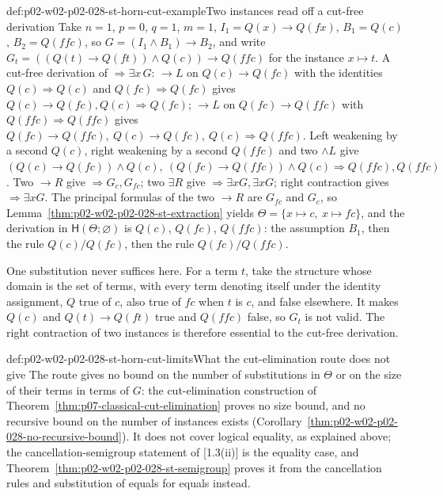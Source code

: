 \begin{hbexample}{def:p02-w02-p02-028-st-horn-cut-example}{Two instances read off a cut-free derivation}
Take \(n=1\), \(p=0\), \(q=1\), \(m=1\), \(I_1=Q(x)\to Q(fx)\),
\(B_1=Q(c)\), \(B_2=Q(ffc)\), so \(G=(I_1\land B_1)\to B_2\), and write
\(G_t=((Q(t)\to Q(ft))\land Q(c))\to Q(ffc)\) for the instance
\(x\mapsto t\).  A cut-free derivation of \(\Rightarrow\exists x\,G\):
\(\to L\) on \(Q(c)\to Q(fc)\) with the identities \(Q(c)\Rightarrow Q(c)\)
and \(Q(fc)\Rightarrow Q(fc)\) gives
\(Q(c)\to Q(fc),Q(c)\Rightarrow Q(fc)\); \(\to L\) on
\(Q(fc)\to Q(ffc)\) with \(Q(ffc)\Rightarrow Q(ffc)\) gives
\(Q(fc)\to Q(ffc),\ Q(c)\to Q(fc),\ Q(c)\Rightarrow Q(ffc)\).  Left
weakening by a second \(Q(c)\), right weakening by a second \(Q(ffc)\) and
two \(\land L\) give
\((Q(c)\to Q(fc))\land Q(c),\ (Q(fc)\to Q(ffc))\land Q(c)\Rightarrow
Q(ffc),Q(ffc)\).  Two \(\to R\) give \(\Rightarrow G_c,G_{fc}\); two
\(\exists R\) give \(\Rightarrow\exists xG,\exists xG\); right contraction
gives \(\Rightarrow\exists xG\).  The principal formulas of the two
\(\to R\) are \(G_{fc}\) and \(G_c\), so
Lemma~\ref{thm:p02-w02-p02-028-st-extraction} yields
\(\Theta=\{x\mapsto c,\ x\mapsto fc\}\), and the derivation in
\(\mathsf H(\Theta;\varnothing)\) is \(Q(c)\), \(Q(fc)\), \(Q(ffc)\): the
assumption \(B_1\), then the rule \(Q(c)/Q(fc)\), then the rule
\(Q(fc)/Q(ffc)\).

One substitution never suffices here.  For a term \(t\), take the structure
whose domain is the set of terms, with every term denoting itself under the
identity assignment, \(Q\) true of \(c\), also true of \(fc\) when \(t\) is
\(c\), and false elsewhere.  It makes \(Q(c)\) and \(Q(t)\to Q(ft)\) true
and \(Q(ffc)\) false, so \(G_t\) is not valid.  The right contraction of two
instances is therefore essential to the cut-free derivation.
\end{hbexample}

\begin{hbwarning}{def:p02-w02-p02-028-st-horn-cut-limits}{What the cut-elimination route does not give}
The route gives no bound on the number of substitutions in \(\Theta\) or on
the size of their terms in terms of \(G\): the cut-elimination construction
of Theorem~\ref{thm:p07-classical-cut-elimination} proves no size bound, and
no recursive bound on the number of instances exists
(Corollary~\ref{thm:p02-w02-p02-028-no-recursive-bound}).  It does not cover
logical equality, as explained above; the cancellation-semigroup statement of
[1.3(ii)] is the equality case, and
Theorem~\ref{thm:p02-w02-p02-028-st-semigroup} proves it from the
cancellation rules and substitution of equals for equals instead.
\end{hbwarning}

